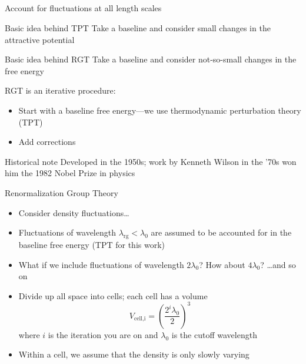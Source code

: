 \documentclass[xcolor=dvipsnames]{beamer}
\newcommand{\lambdaRG}{\ensuremath{\lambda_\text{rg}}}
\begin{document}
\subsection{}

\begin{frame}{Account for fluctuations at all length scales}
  \begin{block}{Basic idea behind TPT}
    Take a baseline and consider small changes in the attractive potential
  \end{block}

  \begin{block}{Basic idea behind RGT}
    Take a baseline and consider not-so-small changes in the free energy
  \end{block}

  RGT is an iterative procedure:
  \begin{itemize}
    \item Start with a baseline free energy---we use thermodynamic perturbation theory (TPT)
    \item Add corrections
  \end{itemize}

  \begin{block}{Historical note}
    Developed in the 1950s; work by Kenneth Wilson in the '70s won him the 1982 Nobel Prize in physics
  \end{block}
\end{frame}

\begin{frame}{Renormalization Group Theory}
  \begin{itemize}
    \item Consider density fluctuations\ldots
    \item Fluctuations of wavelength $\lambdaRG < \lambda_0$ are assumed to be accounted for in the baseline free energy (TPT for this work)
    \item What if we include fluctuations of wavelength $2\lambda_0$? How about $4\lambda_0$? \ldots and so on
    \item Divide up all space into cells; each cell has a volume \[V_\text{cell,i} = \left(\frac{2^i\lambda_0}{2}\right)^3\] where $i$ is the iteration you are on and $\lambda_0$ is the cutoff wavelength
    \item Within a cell, we assume that the density is only slowly varying
  \end{itemize}
\end{frame}
\end{document}
